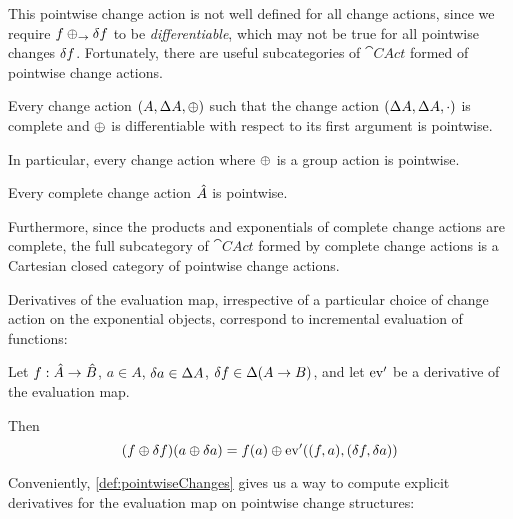 This pointwise change action is not well defined for all change actions, since
we require $f \oplus_\rightarrow \delta f$ to be \emph{differentiable}, which
may not be true for all pointwise changes $\delta f$.
Fortunately, there are useful subcategories of $\cat{CAct}$ formed of pointwise change actions.

\begin{prop}
  \label{prop:pointwiseComplete}
  Every change action $(A,\Delta A,\oplus)$ such that the change action
  $(\Delta A,\Delta A,\cdot)$ is complete and $\oplus$ is differentiable with
  respect to its first argument is pointwise.

  In particular, every change action where $\oplus$ is a group action is pointwise.
\end{prop}

\begin{prop}
   Every complete change action $\hat{A}$ is pointwise.
\end{prop}

Furthermore, since the products and exponentials of complete change actions are complete,
the full subcategory of $\cat{CAct}$ formed by complete change actions is a Cartesian
closed category of pointwise change actions.

Derivatives of the evaluation map, irrespective of a particular choice of change action on the
exponential objects, correspond to incremental evaluation of functions:

\begin{prop}[Incrementalization]
\label{prop:incrementalization}
  Let $f: \hat{A} \rightarrow \hat{B}$, $a \in A$, $\delta a \in
  \Delta A$, $\delta f \in \Delta (A \rightarrow B)$, and let
  $\operatorname{ev}'$ be a derivative of the evaluation map.

  Then
  \begin{displaymath}
    (f \oplus \delta f)(a \oplus \delta a) = f(a) \oplus \operatorname{ev}'((f, a), (\delta f, \delta a))
  \end{displaymath}
\end{prop}

Conveniently, \cref{def:pointwiseChanges} gives us a way to compute explicit derivatives for
the evaluation map on pointwise change structures:

